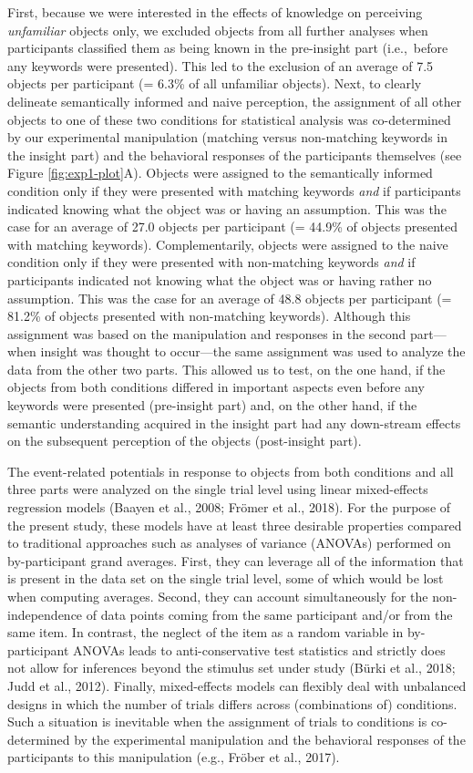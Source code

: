 \documentclass[
  english,
  man,floatsintext]{apa7}
\begin{document}
First, because we were interested in the effects of knowledge on perceiving \emph{unfamiliar} objects only, we excluded objects from all further analyses when participants classified them as being known in the pre-insight part (i.e.,~before any keywords were presented). This led to the exclusion of an average of 7.5 objects per participant (= 6.3\% of all unfamiliar objects). Next, to clearly delineate semantically informed and naive perception, the assignment of all other objects to one of these two conditions for statistical analysis was co-determined by our experimental manipulation (matching versus non-matching keywords in the insight part) and the behavioral responses of the participants themselves (see Figure \ref{fig:exp1-plot}A). Objects were assigned to the semantically informed condition only if they were presented with matching keywords \emph{and} if participants indicated knowing what the object was or having an assumption. This was the case for an average of 27.0 objects per participant (= 44.9\% of objects presented with matching keywords). Complementarily, objects were assigned to the naive condition only if they were presented with non-matching keywords \emph{and} if participants indicated not knowing what the object was or having rather no assumption. This was the case for an average of 48.8 objects per participant (= 81.2\% of objects presented with non-matching keywords). Although this assignment was based on the manipulation and responses in the second part---when insight was thought to occur---the same assignment was used to analyze the data from the other two parts. This allowed us to test, on the one hand, if the objects from both conditions differed in important aspects even before any keywords were presented (pre-insight part) and, on the other hand, if the semantic understanding acquired in the insight part had any down-stream effects on the subsequent perception of the objects (post-insight part).

The event-related potentials in response to objects from both conditions and all three parts were analyzed on the single trial level using linear mixed-effects regression models (Baayen et al., 2008; Frömer et al., 2018). For the purpose of the present study, these models have at least three desirable properties compared to traditional approaches such as analyses of variance (ANOVAs) performed on by-participant grand averages. First, they can leverage all of the information that is present in the data set on the single trial level, some of which would be lost when computing averages. Second, they can account simultaneously for the non-independence of data points coming from the same participant and/or from the same item. In contrast, the neglect of the item as a random variable in by-participant ANOVAs leads to anti-conservative test statistics and strictly does not allow for inferences beyond the stimulus set under study (Bürki et al., 2018; Judd et al., 2012). Finally, mixed-effects models can flexibly deal with unbalanced designs in which the number of trials differs across (combinations of) conditions. Such a situation is inevitable when the assignment of trials to conditions is co-determined by the experimental manipulation and the behavioral responses of the participants to this manipulation (e.g., Fröber et al., 2017).
\end{document}
